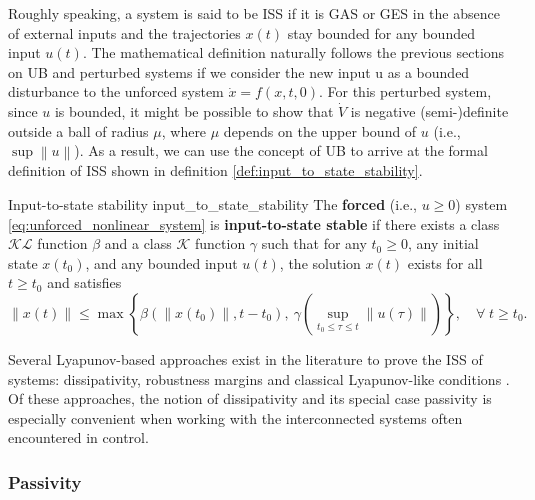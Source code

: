 Roughly speaking, a system is said to be ISS if it is GAS or GES in the absence of external inputs and the trajectories $x \left( t \right)$ stay bounded for any bounded input $u \left( t \right)$. The mathematical definition naturally follows the previous sections on UB and perturbed systems if we consider the new input u as a bounded disturbance to the unforced system $\dot{ x }= f \left( x, t, 0 \right)$. For this perturbed system, since $u$ is bounded, it might be possible to show that $\dot{ V }$ is negative (semi-)definite outside a ball of radius $\mu$, where $\mu$ depends on the upper bound of $u$ (i.e., $\sup{\left\|u\right\|}$). As a result, we can use the concept of UB to arrive at the formal definition of ISS shown in definition \ref{def:input_to_state_stability}.

\begin{definition}[list text=Input-to-state stability,after pre=\footnotetext{Definition 4.4 of \cite{khalilNonlinearControl2015} was slightly changed for consistency with the rest of the text.}]{Input-to-state stability \cite{khalilNonlinearControl2015}\footnotemark}{input_to_state_stability}
  The \textbf{forced} (i.e., $u \ge 0$) system \eqref{eq:unforced_nonlinear_system} is \textbf{input-to-state stable} if there exists a class $\mathcal{KL}$ function $\beta$ and a class $\mathcal{K}$ function $\gamma$ such that for any $t_0 \geq 0$, any initial state $x \left( t_0 \right)$, and any bounded input $u\left( t \right)$, the solution $x \left( t \right)$ exists for all $t \geq t_0$ and satisfies
  \begin{equation}
    \left\|x\left(t\right)\right\| \le \max \left\{ \beta\left(\left\|x\left(t_0 \right)\right\|, t-t_0\right), \ \gamma \left(\sup_{t_0 \leq \tau \leq t}{\left\|u\left(\tau \right)\right\|} \right)\right\}, \quad \forall \; t \geq t_0.
  \end{equation}
\end{definition}

Several Lyapunov-based approaches exist in the literature to prove the ISS of systems: dissipativity, robustness margins and classical Lyapunov-like conditions \cite{khalilNonlinearSystems2002,sontagInputtoStateStabilityProperty1995}. Of these approaches, the notion of dissipativity and its special case passivity is especially convenient when working with the interconnected systems often encountered in control.

\subsubsection{Passivity}

